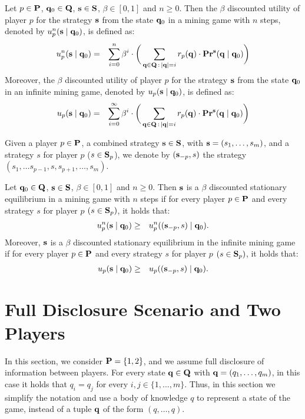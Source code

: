 \documentclass{article}
\begin{document}
\begin{mydef}
Let $p \in \mathbf{P}$, $\mathbf{q}_0 \in \mathbf{Q}$, $\mathbf{s} \in \mathbf{S}$, $\beta \in [0,1]$ and $n \geq 0$. Then the $\beta$ discounted utility of player $p$ for the strategy $\mathbf{s}$ from the state $\mathbf{q}_0$ in a mining game with $n$ steps, denoted by $u_p^n(\mathbf{s} \mid \mathbf{q}_0)$, is defined as:
\begin{eqnarray*}
u_p^n(\mathbf{s} \mid \mathbf{q}_0) & = & \sum_{i=0}^{n}\beta^{i} \cdot  \bigg(\sum_{\mathbf{q} \in \mathbf{Q} \,:\, |\mathbf{q}| = i} r_p(\mathbf{q}) \cdot 
\mathbf{Pr}^{\mathbf{s}}(\mathbf{q} \mid \mathbf{q}_0)\bigg)
\end{eqnarray*}
Moreover, the $\beta$ discounted utility of player $p$ for the strategy $\mathbf{s}$ from the state $\mathbf{q}_0$ in an infinite mining game, denoted by $u_p(\mathbf{s} \mid \mathbf{q}_0)$, is defined as:
\begin{eqnarray*}
u_p(\mathbf{s} \mid \mathbf{q}_0) & = & \sum_{i=0}^{\infty}\beta^{i} \cdot  \bigg(\sum_{\mathbf{q} \in \mathbf{Q} \,:\, |\mathbf{q}| = i} r_p(\mathbf{q}) \cdot 
\mathbf{Pr}^{\mathbf{s}}(\mathbf{q} \mid \mathbf{q}_0)\bigg)
\end{eqnarray*}
\end{mydef}
Given a player $p \in \mathbf{P}$, a combined strategy $\mathbf{s} \in \mathbf{S}$, with $\mathbf{s} = (s_1, \ldots, s_m)$, and a strategy $s$ for player $p$ ($s \in \mathbf{S}_p$), we denote by $(\mathbf{s}_{-p}, s)$ the strategy $(s_1, \ldots s_{p-1},s,s_{p+1}, \ldots, s_{m})$.
\begin{mydef}
Let $\mathbf{q}_0 \in \mathbf{Q}$, $\mathbf{s} \in \mathbf{S}$, $\beta \in [0,1]$ and $n \geq 0$. Then $\mathbf{s}$ is a $\beta$ discounted stationary equilibrium in a mining game with $n$ steps if for every player $p \in \mathbf{P}$ and every strategy $s$ for player $p$ $(s \in\mathbf{S}_p)$, it holds that:
\begin{eqnarray*}
u_p^n(\mathbf{s} \mid \mathbf{q}_0)  & \geq  & u_p^n((\mathbf{s}_{-p},s) \mid \mathbf{q}_0).
\end{eqnarray*}
Moreover, $\mathbf{s}$ is a $\beta$ discounted stationary equilibrium  in  the infinite mining game if for every player $p \in \mathbf{P}$ and every strategy $s$ for player $p$ $(s \in\mathbf{S}_p)$, it holds that:
\begin{eqnarray*}u_p(\mathbf{s} \mid \mathbf{q}_0)  & \geq  & u_p ((\mathbf{s}_{-p},s) \mid \mathbf{q}_0).
\end{eqnarray*}
\end{mydef}



\section{Full Disclosure Scenario and Two Players}
In this section, we consider $\mathbf{P} = \{1,2\}$, and we assume full disclosure of information between players.
For every state $\mathbf{q} \in \mathbf{Q}$ with $\mathbf{q} = (q_1, \ldots, q_m)$, in this case it holds that $q_i = q_j$ for every $i,j \in \{1, \ldots, m\}$. Thus, in this section we simplify the notation and use a body of knowledge $q$ to represent a state of the game, instead of a tuple $\mathbf{q}$ of the form $(q, \ldots, q)$.
\end{document}
